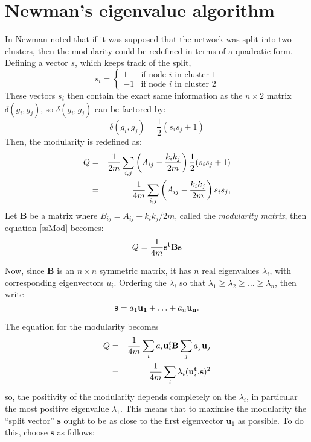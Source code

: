 \section{Newman's eigenvalue algorithm}

In \citep{Newman2006a,Newman2006b} Newman noted that if it was supposed that the network was 
split into two clusters, then the modularity could be redefined in terms of a
quadratic form.  Defining a vector $s$, which keeps track of the
split,
\begin{equation}
s_i = \left\{ \begin{array}{ll} 1 & \mbox{if node $i$ in cluster 1}
  \\ -1 & \mbox{if node $i$ in cluster 2}\end{array} \right.
\end{equation}
These vectors $s_i$ then contain the exact same information as the $n\times 2$ matrix $\delta (g_i,g_j)$, so $\delta (g_i,g_j) $ can be factored by:
\begin{equation}
\delta (g_i,g_j) = \frac{1}{2} \left( s_i s_j + 1 \right)
\end{equation}
Then, the modularity is redefined as:
\begin{eqnarray} \label{ssMod}
Q & = & \frac{1}{2m}\sum_{i,j} \left(A_{ij} - \frac{k_ik_j}{2m}\right)\frac{1}{2}(s_is_j + 1)\cr
& = &\frac{1}{4m}\sum_{i,j} \left(A_{ij} - \frac{k_ik_j}{2m}\right)s_is_j,
\end{eqnarray}
Let $\mathbf{B}$ be a matrix where 
$B_{ij} = A_{ij} - k_ik_j/2m$, called the \emph{modularity matrix}, 
then equation \ref{ssMod} becomes:
\begin{equation}
Q = \frac{1}{4m}{\bf s^tBs}
\end{equation}

Now, since $\mathbf{B}$ is an $n\times n$ symmetric matrix, it has $n$ real eigenvalues $\lambda_i$, with corresponding
eigenvectors $u_i$.  Ordering the $\lambda_i$ so that $
\lambda_1 \geq \lambda_2 \geq \ldots \geq \lambda_n$, then write 
\begin{equation}
{\bf s} = a_1{\bf u_1}+ \ldots + a_n{\bf u_n}.
\end{equation}


The equation for the modularity becomes
\begin{eqnarray}
Q & = & \frac{1}{4m} \sum_{i} a_i{\bf u}_i^t{\bf B}\sum_ja_j{\bf u}_j\cr
& = & \frac{1}{4m} \sum_i \lambda_i ({\bf u}_i^{\bf t}.{\bf s})^2
\end{eqnarray}
so, the positivity of the modularity depends completely on the $\lambda_i$, in 
particular the most positive eigenvalue $\lambda_1$.  This means that to 
maximise the modularity the ``split vector'' $\mathbf{s}$ ought to be 
as close to the first eigenvector $\mathbf{u}_1$ as possible. To do this, 
choose $\mathbf{s}$ as follows:

